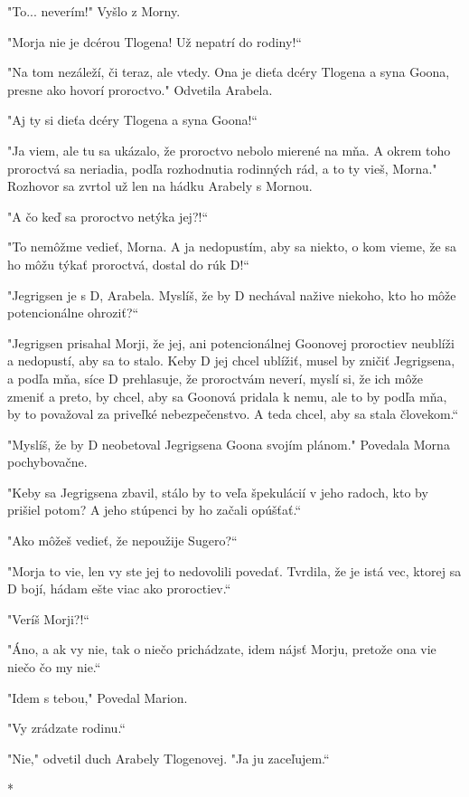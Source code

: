 \documentclass{book}
\begin{document}
"$ $To... neverím!"$ $ Vyšlo z Morny.

"$ $Morja nie je dcérou Tlogena! Už nepatrí do rodiny!“

"$ $Na tom nezáleží, či teraz, ale vtedy. Ona je dieťa dcéry Tlogena a syna Goona, presne ako hovorí proroctvo."$ $ Odvetila Arabela.

"$ $Aj ty si dieťa dcéry Tlogena a syna Goona!“

"$ $Ja viem, ale tu sa ukázalo, že proroctvo nebolo mierené na mňa. A okrem toho proroctvá sa neriadia, podľa rozhodnutia rodinných rád, a to ty vieš, Morna."$ $ Rozhovor sa zvrtol už len na hádku Arabely s Mornou.

"$ $A čo keď sa proroctvo netýka jej?!“

"$ $To nemôžme vedieť, Morna. A ja nedopustím, aby sa niekto, o kom vieme, že sa ho môžu týkať proroctvá, dostal do rúk D!“

"$ $Jegrigsen je s D, Arabela. Myslíš, že by D nechával nažive niekoho, kto ho môže potencionálne ohroziť?“

"$ $Jegrigsen prisahal Morji, že jej, ani potencionálnej Goonovej proroctiev neublíži a nedopustí, aby sa to stalo. Keby D jej chcel ublížiť, musel by zničiť Jegrigsena, a podľa mňa, síce D prehlasuje, že proroctvám neverí, myslí si, že ich môže zmeniť a preto, by chcel, aby sa Goonová pridala k nemu, ale to by podľa mňa, by to považoval za priveľké nebezpečenstvo. A teda chcel, aby sa stala človekom.“

"$ $Myslíš, že by D neobetoval Jegrigsena Goona svojím plánom."$ $ Povedala Morna pochybovačne.

"$ $Keby sa Jegrigsena zbavil, stálo by to veľa špekulácií v jeho radoch, kto by prišiel potom? A jeho stúpenci by ho začali opúšťať.“

"$ $Ako môžeš vedieť, že nepoužije Sugero?“

"$ $Morja to vie, len vy ste jej to nedovolili povedať. Tvrdila, že je istá vec, ktorej sa D bojí, hádam ešte viac ako proroctiev.“

"$ $Veríš Morji?!“

"$ $Áno, a ak vy nie, tak o niečo prichádzate, idem nájsť Morju, pretože ona vie niečo čo my nie.“

"$ $Idem s tebou,"$ $ Povedal Marion.

"$ $Vy zrádzate rodinu.“

"$ $Nie,"$ $ odvetil duch Arabely Tlogenovej. "$ $Ja ju zaceľujem.“

\begin{center}
*
\end{center}
\end{document}
